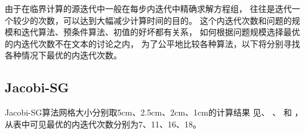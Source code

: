 由于在临界计算的源迭代中一般在每步内迭代中精确求解方程组，
往往是迭代一个较少的次数，可以达到大幅减少计算时间的目的。
这个内迭代次数和问题的规模和迭代算法、预条件算法、初值的好坏都有关系，
如何根据问题规模选择最优的内迭代次数不在文本的讨论之内，
为了公平地比较各种算法，以下将分别寻找各种情况下最优的内迭代次数。

\subsection{Jacobi-SG}
\label{sec:equsolve.iter.jacobi-sg}

Jacobi-SG算法网格大小分别取5cm、2.5cm、2cm、1cm的计算结果
见、%
、%
和%
，
从表中可见最优的内迭代次数分别为7、11、16、18。

